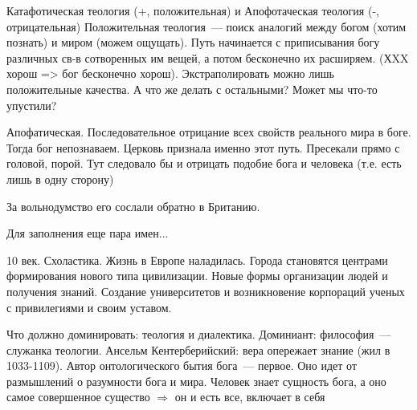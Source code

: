 Катафотическая теология (+, положительная) и Апофотаческая теология (-, отрицательная)
Положительная теология~--- поиск аналогий между богом (хотим познать) и миром (можем ощущать). Путь начинается с приписывания богу различных св-в сотворенных им вещей, а потом бесконечно их расширяем. (ХXX хорош => бог бесконечно хорош). Экстраполировать можно лишь положительные качества. А что же делать с остальными? Может мы что-то упустили?

Апофатическая. Последовательное отрицание всех свойств реального мира в боге. Тогда бог непознаваем. Церковь признала именно этот путь. Пресекали прямо с головой, порой. Тут следовало бы и отрицать подобие бога и человека (т.е. есть лишь в одну сторону)

За вольнодумство его сослали обратно в Британию.

Для заполнения еще пара имен...

10 век. Схоластика.
Жизнь в Европе наладилась. Города становятся центрами формирования нового типа цивилизации. Новые формы организации людей и получения знаний. Создание университетов и возникновение корпораций ученых с привилегиями и своим уставом.

Что должно доминировать: теология и диалектика.
Доминиант: философия~--- служанка теологии.
Ансельм Кентерберийский: вера опережает знание (жил в 1033-1109). Автор онтологического бытия бога~--- первое. Оно идет от размышлений о разумности бога и мира. Человек знает сущность бога, а оно самое совершенное существо $\Rightarrow$ он и есть все, включает в себя
